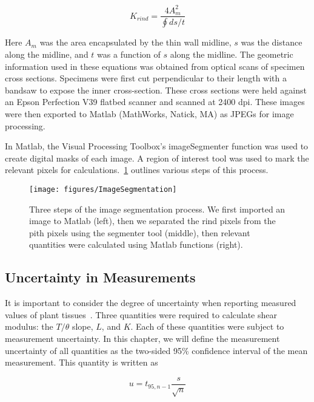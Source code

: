\begin{equation}
	\label{eq:krind}
	K_{rind} = \frac{4A_{m}^{2}}{\oint ds/t}
\end{equation}

Here ${A_{m}}$ was the area encapsulated by the thin wall midline, ${s}$ was the distance along the midline, and ${t}$ was a function of ${s}$ along the midline.
The geometric information used in these equations was obtained from optical scans of specimen cross sections. Specimens were first cut perpendicular to their length with a bandsaw to expose the inner cross-section. These cross sections were held against an Epson Perfection V39 flatbed scanner and scanned at 2400 dpi. These images were then exported to Matlab (MathWorks, Natick, MA) as JPEGs for image processing.

In Matlab, the Visual Processing Toolbox’s {\ttfamily imageSegmenter} function was used to create digital masks of each image. A region of interest tool was used to mark the relevant pixels for calculations.~\cref{fig:ImageSegmentation} outlines various steps of this process.

\begin{figure}[htbp]
	\centering
	\texttt{[image: figures/ImageSegmentation]}
	\caption[Three steps of the image segmentation process.]{Three steps of the image segmentation process. We first imported an image to Matlab (left), then we separated the rind pixels from the pith pixels using the segmenter tool (middle), then relevant quantities were calculated using Matlab functions (right).}
	\label{fig:ImageSegmentation}
\end{figure}

\subsection{Uncertainty in Measurements}
\label{ssec:uncertainty_in_measurements}
It is important to consider the degree of uncertainty when reporting measured values of plant tissues~. Three quantities were required to calculate shear modulus:  the ${T/\theta}$ slope, ${L}$, and ${K}$. Each of these quantities were subject to measurement uncertainty. In this chapter, we will define the measurement uncertainty of all quantities as the two-sided 95\% confidence interval of the mean measurement. This quantity is written as

\begin{equation}
	\label{eq:uncertainty}
	u = t_{95,n-1} \frac{s}{\sqrt{n}}
\end{equation}

